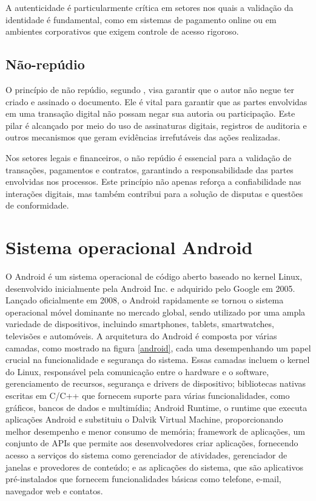     A autenticidade é particularmente crítica em setores nos quais a validação da identidade é fundamental, como em sistemas de pagamento online ou em ambientes corporativos que exigem controle de acesso rigoroso.
    
    \subsection{Não-repúdio}
    O princípio de não repúdio, segundo , visa garantir que o autor não negue ter criado e assinado o documento. Ele é vital para garantir que as partes envolvidas em uma transação digital não possam negar sua autoria ou participação. Este pilar é alcançado por meio do uso de assinaturas digitais, registros de auditoria e outros mecanismos que geram evidências irrefutáveis das ações realizadas. 
    
    Nos setores legais e financeiros, o não repúdio é essencial para a validação de transações, pagamentos e contratos, garantindo a responsabilidade das partes envolvidas nos processos. Este princípio não apenas reforça a confiabilidade nas interações digitais, mas também contribui para a solução de disputas e questões de conformidade.
    
    \section{Sistema operacional Android}
    O Android \cite{Doc2024} é um sistema operacional de código aberto baseado no kernel Linux, desenvolvido inicialmente pela Android Inc. e adquirido pelo Google em 2005. Lançado oficialmente em 2008, o Android rapidamente se tornou o sistema operacional móvel dominante no mercado global, sendo utilizado por uma ampla variedade de dispositivos, incluindo smartphones, tablets, smartwatches, televisões e automóveis. A arquitetura do Android é composta por várias camadas, como mostrado na figura \ref{android}, cada uma desempenhando um papel crucial na funcionalidade e segurança do sistema. Essas camadas incluem o kernel do Linux, responsável pela comunicação entre o hardware e o software, gerenciamento de recursos, segurança e drivers de dispositivo; bibliotecas nativas escritas em C/C++ que fornecem suporte para várias funcionalidades, como gráficos, bancos de dados e multimídia; Android Runtime, o runtime que executa aplicações Android e substituiu o Dalvik Virtual Machine, proporcionando melhor desempenho e menor consumo de memória; framework de aplicações, um conjunto de APIs que permite aos desenvolvedores criar aplicações, fornecendo acesso a serviços do sistema como gerenciador de atividades, gerenciador de janelas e provedores de conteúdo; e as aplicações do sistema, que são aplicativos pré-instalados que fornecem funcionalidades básicas como telefone, e-mail, navegador web e contatos.
    
